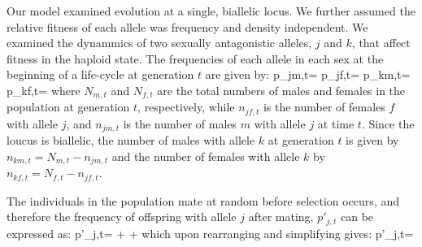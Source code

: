 \documentclass[12pt]{article}
\let\oldequation\equation
\let\oldendequation\endequation
\renewenvironment{equation}
  {\linenomathNonumbers\oldequation}
  {\oldendequation\endlinenomath}
\begin{document}
Our model examined evolution at a single, biallelic locus. We further assumed the relative fitness of each allele was frequency and density independent. We examined the dynammics of two  sexually antagonistic alleles, $j$ and $k$, that affect fitness in the haploid state. The frequencies of each allele in each sex at the beginning of a life-cycle at generation $t$ are given by:
\begin{equation}
    p_{jm,t}= 
    \label{first_pop}
\end{equation}
\begin{equation}
    p_{jf,t}= 
\end{equation}
\begin{equation}
    p_{km,t}=  
\end{equation}
\begin{equation}
    p_{kf,t}= 
\end{equation}
where $N_{m,t}$ and $N_{f,t}$ are the total numbers of males and females in the population at generation $t$, respectively, while $n_{jf,t}$ is the number of females $f$ with allele $j$, and $n_{jm,t}$ is the number of males $m$ with allele $j$ at time $t$. Since the loucus is biallelic, the number of males with allele $k$ at generation $t$ is given by $n_{km,t}=N_{m,t}-n_{jm,t}$ and the number of females with allele $k$ by $n_{kf,t}=N_{f,t}-n_{jf,t}$.

The individuals in the population mate at random before selection occurs, and therefore the frequency of offspring with allele $j$ after mating, $p'_{j,t}$ can be expressed as:
\begin{equation}
   p'_{j,t}=   +    +
    
   \label{prime_a}
\end{equation}
which upon rearranging and simplifying gives:
\begin{equation}
   p'_{j,t}= 
   \label{pprime}
\end{equation}
\end{document}
